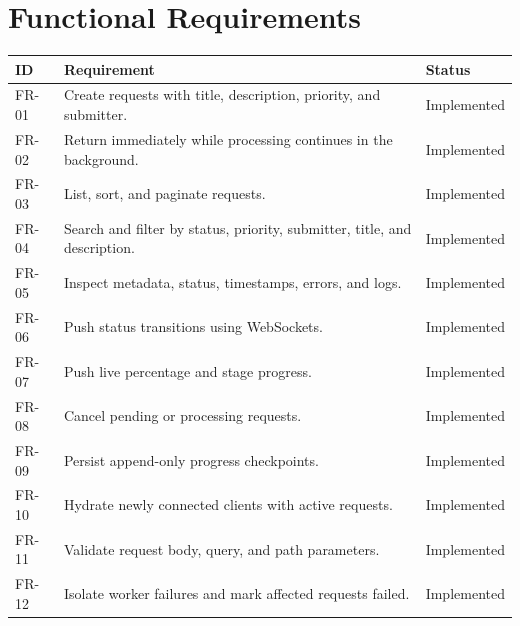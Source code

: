 \documentclass[11pt,a4paper]{article}
\begin{document}
\section{Functional Requirements}
\begin{longtable}{p{}p{}p{}}
\toprule
\textbf{ID} & \textbf{Requirement} & \textbf{Status}\\\midrule
FR-01 & Create requests with title, description, priority, and submitter. & Implemented\\
FR-02 & Return immediately while processing continues in the background. & Implemented\\
FR-03 & List, sort, and paginate requests. & Implemented\\
FR-04 & Search and filter by status, priority, submitter, title, and description. & Implemented\\
FR-05 & Inspect metadata, status, timestamps, errors, and logs. & Implemented\\
FR-06 & Push status transitions using WebSockets. & Implemented\\
FR-07 & Push live percentage and stage progress. & Implemented\\
FR-08 & Cancel pending or processing requests. & Implemented\\
FR-09 & Persist append-only progress checkpoints. & Implemented\\
FR-10 & Hydrate newly connected clients with active requests. & Implemented\\
FR-11 & Validate request body, query, and path parameters. & Implemented\\
FR-12 & Isolate worker failures and mark affected requests failed. & Implemented\\
\bottomrule
\end{longtable}
\end{document}
